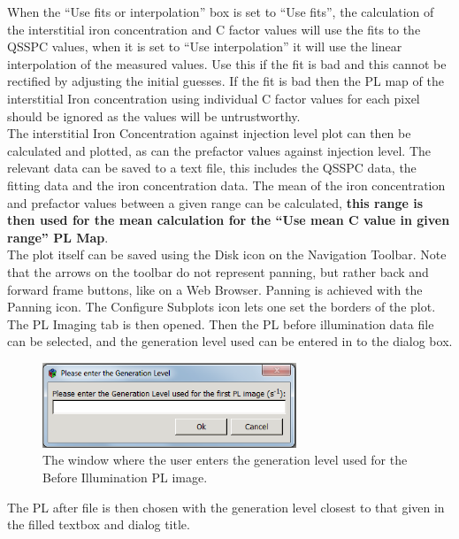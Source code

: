 \documentclass[final,a4paper,oneside,12pt]{article}
\begin{document}
When the ``Use fits or interpolation'' box is set to ``Use fits'', the calculation of the interstitial iron concentration and C factor values will use the fits to the QSSPC values, when it is set to ``Use interpolation'' it will use the linear interpolation of the measured values. Use this if the fit is bad and this cannot be rectified by adjusting the initial guesses. If the fit is bad then the PL map of the interstitial Iron concentration using individual C factor values for each pixel should be ignored as the values will be untrustworthy.
\\
The interstitial Iron Concentration against injection level plot can then be calculated and plotted, as can the prefactor values against injection level. The relevant data can be saved to a text file, this includes the QSSPC data, the fitting data and the iron concentration data. The mean of the iron concentration and prefactor values between a given range can be calculated, {\bf this range is then used for the mean calculation for the ``Use mean C value in given range'' PL Map}.
\\
The plot itself can be saved using the Disk icon on the Navigation Toolbar. Note that the arrows on the toolbar do not represent panning, but rather back and forward frame buttons, like on a Web Browser. Panning is achieved with the Panning icon. The Configure Subplots icon lets one set the borders of the plot.\\

The PL Imaging tab is then opened. Then the PL before illumination data file can be selected, and the generation level used can be entered in to the dialog box.

\begin{figure}[h!]
\includegraphics[height=1in]{2genlevel}
\caption{\label{figure2} The window where the user enters the generation level used for the Before Illumination PL image.}
\end{figure}

The PL after file is then chosen with the generation level closest to that given in the filled textbox and dialog title.
\end{document}
